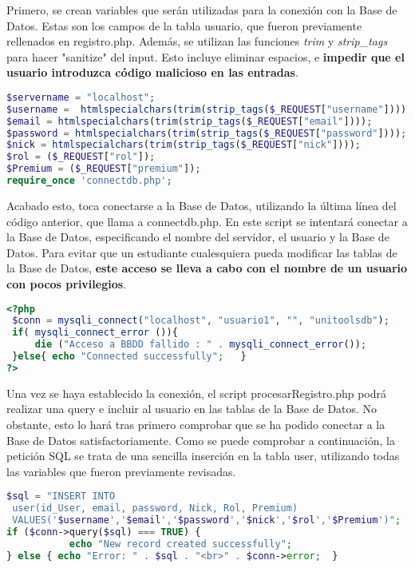 \documentclass[12pt]{report}
\begin{document}
Primero, se crean variables que serán utilizadas para la conexión con la Base de Datos. Estas son los campos de la tabla usuario, que fueron previamente rellenados en registro.php. Además, se utilizan las funciones \textit{trim} y \textit{strip\_tags} para hacer "sanitize" del input. Esto incluye eliminar espacios, e \textbf{impedir que el usuario introduzca código malicioso en las entradas}.
\newline
\begin{lstlisting}[language=PHP]
$servername = "localhost";
$username =  htmlspecialchars(trim(strip_tags($_REQUEST["username"])));
$email = htmlspecialchars(trim(strip_tags($_REQUEST["email"])));
$password = htmlspecialchars(trim(strip_tags($_REQUEST["password"])));
$nick = htmlspecialchars(trim(strip_tags($_REQUEST["nick"])));
$rol = ($_REQUEST["rol"]);
$Premium = ($_REQUEST["premium"]);
require_once 'connectdb.php';
\end{lstlisting}

Acabado esto, toca conectarse a la Base de Datos, utilizando la última línea del código anterior, que llama a connectdb.php. En este script se intentará conectar a la Base de Datos,
especificando el nombre del servidor, el usuario y la Base de Datos. Para evitar que un estudiante cualesquiera pueda modificar las tablas de la Base de Datos, \textbf{este acceso se lleva a cabo con el nombre de un usuario con pocos privilegios}.
\newline
\begin{lstlisting}[language=PHP]
<?php
 $conn = mysqli_connect("localhost", "usuario1", "", "unitoolsdb");
 if( mysqli_connect_error ()){
     die ("Acceso a BBDD fallido : " . mysqli_connect_error());
 }else{ echo "Connected successfully";   }
?>
\end{lstlisting}
Una vez se haya establecido la conexión, el script procesarRegistro.php podrá realizar una query e incluir al usuario en las tablas de la Base de Datos. No obstante, esto lo hará tras primero comprobar que se ha podido conectar a la Base de Datos satisfactoriamente. Como se puede comprobar a continuación, la petición SQL se trata de una sencilla inserción en la tabla user, utilizando todas las variables que fueron previamente revisadas.

\begin{lstlisting}[language=PHP]
$sql = "INSERT INTO 
 user(id_User, email, password, Nick, Rol, Premium) 
 VALUES('$username','$email','$password','$nick','$rol','$Premium')";
if ($conn->query($sql) === TRUE) {
           echo "New record created successfully";
} else { echo "Error: " . $sql . "<br>" . $conn->error;  }  
\end{lstlisting}
\end{document}
